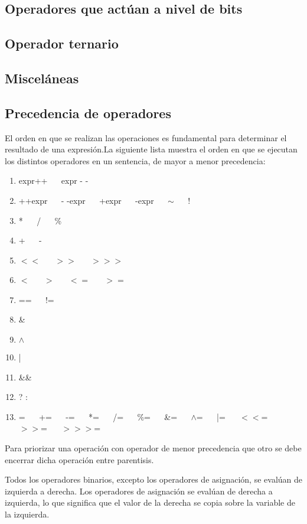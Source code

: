 \subsection{Operadores que actúan a nivel de bits}


\subsection{Operador ternario}


\subsection{Misceláneas}


\subsection{Precedencia de operadores}

El orden en que se realizan las operaciones es fundamental para determinar el resultado de una
expresión.La siguiente lista muestra el orden en que se ejecutan los distintos operadores en
un sentencia, de mayor a menor precedencia:

\begin{enumerate}
	\item expr++ $\quad$  expr - -
	\item ++expr $\quad$  - -expr $\quad$  +expr $\quad$  -expr $\quad$  $\sim$ $\quad$ !
	\item * $\quad$  / $\quad$  \%
	\item + $\quad$  -
	\item $<<$ $\quad$  $>>$ $\quad$  $>>>$
	\item $<$ $\quad$  $>$ $\quad$  $<=$ $\quad$  $>=$
	\item == $\quad$ !=
	\item \&
	\item $\wedge$
	\item |
	\item \&\&
	\item ? :
	\item = $\quad$ += $\quad$ -=  $\quad$ *= $\quad$ /= $\quad$ \%= $\quad$ \&= $\quad$ $\wedge$= $\quad$ |= $\quad$ $<<$= $\quad$ $>>$=  $\quad$ $>>>$=
	
\end{enumerate}

Para priorizar una operación con operador de menor precedencia que otro se debe encerrar dicha operación entre parentisis.

Todos los operadores binarios, excepto los operadores de asignación, se evalúan de
izquierda a derecha. Los operadores de asignación se evalúan de derecha a izquierda, lo que
significa que el valor de la derecha se copia sobre la variable de la izquierda.